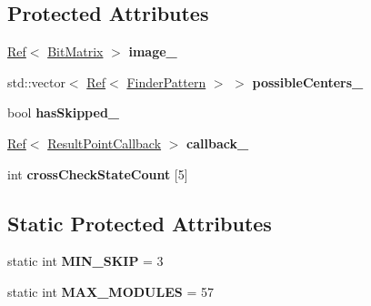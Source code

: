 \subsection*{Protected Attributes}
\begin{DoxyCompactItemize}
\item 
\mbox{\label{classzxing_1_1qrcode_1_1_finder_pattern_finder_af9535b5eda920af6de361925d491d2ee}} 
\mbox{\hyperlink{classzxing_1_1_ref}{Ref}}$<$ \mbox{\hyperlink{classzxing_1_1_bit_matrix}{Bit\+Matrix}} $>$ {\bfseries image\+\_\+}
\item 
\mbox{\label{classzxing_1_1qrcode_1_1_finder_pattern_finder_acede028066a1de692abcf14facf71765}} 
std\+::vector$<$ \mbox{\hyperlink{classzxing_1_1_ref}{Ref}}$<$ \mbox{\hyperlink{classzxing_1_1qrcode_1_1_finder_pattern}{Finder\+Pattern}} $>$ $>$ {\bfseries possible\+Centers\+\_\+}
\item 
\mbox{\label{classzxing_1_1qrcode_1_1_finder_pattern_finder_a55a8143304757d6a6a6a79eac1b0e520}} 
bool {\bfseries has\+Skipped\+\_\+}
\item 
\mbox{\label{classzxing_1_1qrcode_1_1_finder_pattern_finder_a8766fe5d7ffc4b5d68c649b86b28913a}} 
\mbox{\hyperlink{classzxing_1_1_ref}{Ref}}$<$ \mbox{\hyperlink{classzxing_1_1_result_point_callback}{Result\+Point\+Callback}} $>$ {\bfseries callback\+\_\+}
\item 
\mbox{\label{classzxing_1_1qrcode_1_1_finder_pattern_finder_ac862f7635ac8516d6d32860c5edf764a}} 
int {\bfseries cross\+Check\+State\+Count} \mbox{[}5\mbox{]}
\end{DoxyCompactItemize}
\subsection*{Static Protected Attributes}
\begin{DoxyCompactItemize}
\item 
\mbox{\label{classzxing_1_1qrcode_1_1_finder_pattern_finder_aa22cebe17cc2fdbfd702a714a752c304}} 
static int {\bfseries M\+I\+N\+\_\+\+S\+K\+IP} = 3
\item 
\mbox{\label{classzxing_1_1qrcode_1_1_finder_pattern_finder_a568c4453eb674e049a5bb5733b85bfb5}} 
static int {\bfseries M\+A\+X\+\_\+\+M\+O\+D\+U\+L\+ES} = 57
\end{DoxyCompactItemize}


